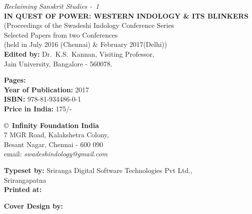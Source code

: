 \thispagestyle{empty}
\noindent
{\fontsize{9}{11}\selectfont\sl Reclaiming Sanskrit Studies - 1}\\
{\bf IN QUEST OF POWER: WESTERN INDOLOGY \& ITS BLINKERS}\\ 
(Proceedings of the Swadeshi Indology Conference Series\\
Selected Papers from two Conferences\\ 
(held in July 2016 (Chennai) \& February 2017(Delhi))\\
{\bf Edited by:} Dr.\ K.S.\ Kannan, Visiting Professor,\\ 
Jain University, Bangalore - 560078.
\vfill

\noindent
{\bf Pages:} \pageref{bookend}\\
{\bf Year of Publication:} 2017\\
{\bf ISBN:} 978-81-934486-0-1\\
{\bf Price in India:} 175/-
\vfill

\noindent
\copyright\ {\bf Infinity Foundation India}\\ 
7 MGR Road, Kalakshetra Colony,\\ 
Besant Nagar, Chennai - 600 090\\
email: {\sl swadeshindology@gmail.com} 
\vfill

\noindent
{\bf Typeset by:} Sriranga Digital Software Technologies Pvt Ltd.,\\ 
Srirangapatna\\

\noindent
{\bf Printed at:}

\noindent
{\bf Cover Design by:}
